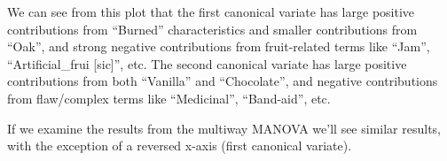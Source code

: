\documentclass[
]{book}
\newenvironment{Shaded}{\begin{snugshade}}{\end{snugshade}}
\newcommand{\AttributeTok}[1]{\textcolor[rgb]{0.13,0.29,0.53}{#1}}
\newcommand{\DecValTok}[1]{\textcolor[rgb]{0.00,0.00,0.81}{#1}}
\newcommand{\FloatTok}[1]{\textcolor[rgb]{0.00,0.00,0.81}{#1}}
\newcommand{\FunctionTok}[1]{\textcolor[rgb]{0.13,0.29,0.53}{\textbf{#1}}}
\newcommand{\NormalTok}[1]{#1}
\newcommand{\SpecialCharTok}[1]{\textcolor[rgb]{0.81,0.36,0.00}{\textbf{#1}}}
\newcommand{\StringTok}[1]{\textcolor[rgb]{0.31,0.60,0.02}{#1}}
\begin{document}
We can see from this plot that the first canonical variate has large positive contributions from ``Burned'' characteristics and smaller contributions from ``Oak'', and strong negative contributions from fruit-related terms like ``Jam'', ``Artificial\_frui {[}sic{]}'', etc. The second canonical variate has large positive contributions from both ``Vanilla'' and ``Chocolate'', and negative contributions from flaw/complex terms like ``Medicinal'', ``Band-aid'', etc.

If we examine the results from the multiway MANOVA we'll see similar results, with the exception of a reversed x-axis (first canonical variate).

\begin{Shaded}
\end{Shaded}
\end{document}
